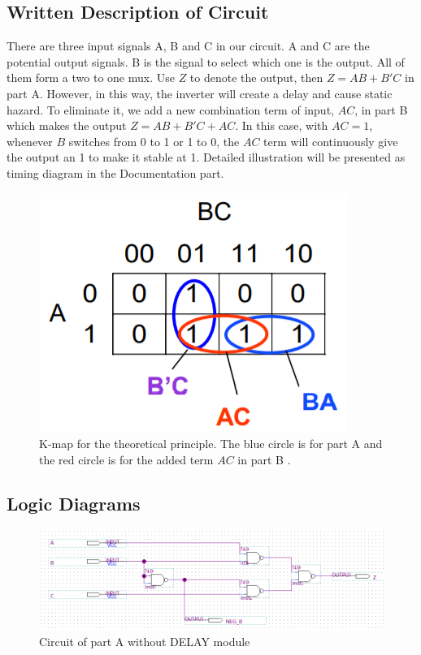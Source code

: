 \documentclass[12pt]{article}
\begin{document}
\subsection{\textbf{Written Description of Circuit}}
There are three input signals A, B and C in our circuit. A and C are the potential output signals. B is the signal to select which one is the output. All of them form a two to one mux. Use $Z$ to denote the output, then $Z=AB+B'C$ in part A. However, in this way, the inverter will create a delay and cause static hazard. To eliminate it, we add a new combination term of input, $AC$, in part B which makes the output $Z=AB+B'C+AC$. In this case, with $AC=1$, whenever $B$ switches from 0 to 1 or 1 to 0, the $AC$ term will continuously give the output an 1 to make it stable at 1. Detailed illustration will be presented as timing diagram in the Documentation part.
\begin{figure}[H]
    \centering
    \includegraphics[scale=0.5]{K_map.png}
    \caption{K-map for the theoretical principle. The blue circle is for part A and the red circle is for the added term $AC$ in part B \cite{PPT}.}
\end{figure}


\subsection{\textbf{Logic Diagrams}}
\begin{figure}[H]
    \centering
    \includegraphics[scale=0.7]{lab1_partA.png}
    \caption{Circuit of part A without DELAY module}
\end{figure}
\end{document}
